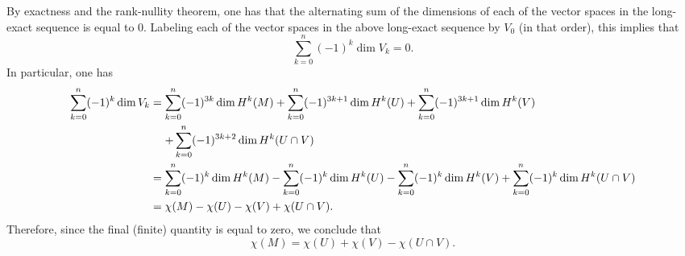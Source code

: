 \documentclass{article}
\begin{document}
	By exactness and the rank-nullity theorem, one has that the alternating sum of the dimensions of each of the vector spaces in the long-exact sequence is equal to 0. Labeling each of the vector spaces in the above long-exact sequence by $V_{0}$ (in that order), this implies that 
	\begin{equation*}
		\sum_{k = 0}^{n}(-1)^{k}\dim{V_{k}} = 0. 
	\end{equation*}
	In particular, one has 
	\begin{align*}
		\begin{split}
		\sum_{k = 0}^{n}(-1)^{k}\dim{V_{k}} &= \sum_{k = 0}^{n}(-1)^{3k}\dim{H^{k}(M)} + \sum_{k = 0}^{n}(-1)^{3k + 1}\dim{H^{k}(U)} + \sum_{k = 0}^{n}(-1)^{3k + 1}\dim{H^{k}(V)} \\
		&\mathcolor{white}{=} + \sum_{k = 0}^{n}(-1)^{3k + 2}\dim{H^{k}}(U \cap V) \\
		&= \sum_{k = 0}^{n}(-1)^{k}\dim{H^{k}(M)} -\sum_{k = 0}^{n}(-1)^{k}\dim{H^{k}(U)} -\sum_{k = 0}^{n}(-1)^{k}\dim{H^{k}(V)} + \sum_{k = 0}^{n}(-1)^{k}\dim{H^{k}(U \cap V)} \\
		&= \chi(M) - \chi(U) - \chi(V) + \chi(U \cap V). 
		\end{split}
	\end{align*}
	Therefore, since the final (finite) quantity is equal to zero, we conclude that 
	\begin{equation*}
		\chi(M) = \chi(U) + \chi(V) - \chi(U \cap V). 
	\end{equation*}
	
\end{document}
